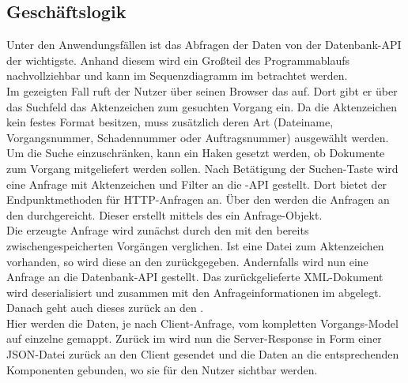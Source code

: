 \subsection{Geschäftslogik}
\label{sec:Geschaeftslogik}
Unter den Anwendungsfällen ist das Abfragen der Daten von der Datenbank-\acs{API} der wichtigste.
Anhand diesem wird ein Großteil des Programmablaufs nachvollziehbar und kann im Sequenzdiagramm
im  betrachtet werden.\\
Im gezeigten Fall ruft der Nutzer über seinen Browser das  auf.
Dort gibt er über das Suchfeld das Aktenzeichen zum gesuchten Vorgang ein. Da die Aktenzeichen kein festes 
Format besitzen, muss zusätzlich deren Art (Dateiname, Vorgangsnummer, Schadennummer oder Auftragsnummer)
ausgewählt werden. Um die Suche einzuschränken, kann ein Haken gesetzt werden, ob Dokumente zum Vorgang mitgeliefert werden sollen.
Nach Betätigung der Suchen-Taste wird eine Anfrage mit Aktenzeichen und Filter an die 
-\acs{API} gestellt. Dort bietet der  Endpunktmethoden für \acs{HTTP}-Anfragen an.
Über den  werden die Anfragen an den  durchgereicht.
Dieser erstellt mittels des  ein Anfrage-Objekt.\\
Die erzeugte Anfrage wird zunächst durch den  mit den bereits zwischengespeicherten
Vorgängen verglichen. Ist eine Datei zum Aktenzeichen vorhanden, so wird diese an den  
zurückgegeben. Andernfalls wird nun eine Anfrage an die Datenbank-\acs{API} gestellt.
Das zurückgelieferte \acs{XML}-Dokument wird deserialisiert und zusammen mit den Anfrageinformationen im  abgelegt.
Danach geht auch dieses zurück an den .\\
Hier werden die Daten, je nach Client-Anfrage, vom kompletten Vorgangs-Model auf einzelne  gemappt.
Zurück im  wird nun die Server-Response in Form einer \acs{JSON}-Datei zurück an den Client gesendet und die Daten
an die entsprechenden Komponenten gebunden, wo sie für den Nutzer sichtbar werden.

